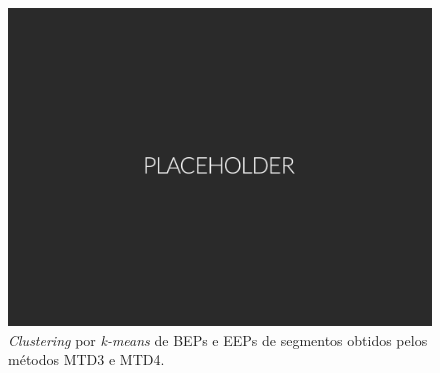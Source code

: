 \begin{figure}[htb]
	\caption{\label{flow:RNAresumo}\emph{Clustering} por \emph{k-means} de BEPs e EEPs de segmentos obtidos pelos métodos MTD3 e MTD4.}
	\begin{center}
	    \includegraphics[width=0.75\linewidth]{./img/placeholder.png}
	\end{center}
\end{figure}
